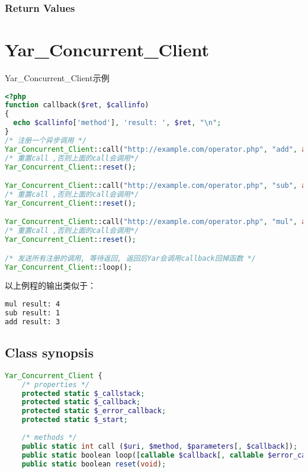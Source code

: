\subsection{Return Values}



\chapter{Yar\_Concurrent\_Client}


\begin{example}
Yar\_Concurrent\_Client示例
\begin{lstlisting}[language=PHP]
<?php
function callback($ret, $callinfo)
{
  echo $callinfo['method'], 'result: ', $ret, "\n";
}
/* 注册一个异步调用 */
Yar_Concurrent_Client::call("http://example.com/operator.php", "add", array(1, 2), "callback");
/* 重置call ,否则上面的call会调用*/
Yar_Concurrent_Client::reset();

Yar_Concurrent_Client::call("http://example.com/operator.php", "sub", array(2, 1), "callback");
/* 重置call ,否则上面的call会调用*/
Yar_Concurrent_Client::reset();

Yar_Concurrent_Client::call("http://example.com/operator.php", "mul", array(2, 2), "callback");
/* 重置call ,否则上面的call会调用*/
Yar_Concurrent_Client::reset();

/* 发送所有注册的调用, 等待返回, 返回后Yar会调用callback回掉函数 */
Yar_Concurrent_Client::loop();


\end{lstlisting}
\end{example}

以上例程的输出类似于：

\begin{lstlisting}[language=bash]
mul result: 4
sub result: 1
add result: 3
\end{lstlisting}


\section{Class synopsis}


\begin{lstlisting}[language=PHP]
Yar_Concurrent_Client {
    /* properties */
    protected static $_callstack;
    protected static $_callback;
    protected static $_error_callback;
    protected static $_start;
    
    /* methods */
    public static int call ($uri, $method, $parameters[, $callback]);
    public static boolean loop([callable $callback[, callable $error_callback]]);
    public static boolean reset(void);
\end{lstlisting}

